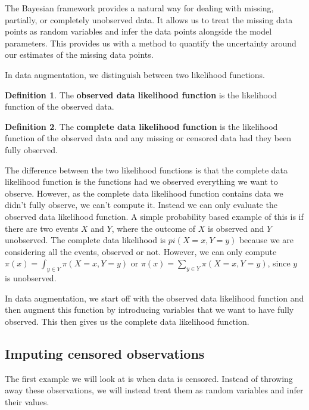 \documentclass[
]{book}
\theoremstyle{definition}
\newtheorem{definition}{Definition}[chapter]
\theoremstyle{definition}
\theoremstyle{definition}
\theoremstyle{definition}
\theoremstyle{remark}
\begin{document}
The Bayesian framework provides a natural way for dealing with missing, partially, or completely unobserved data. It allows us to treat the missing data points as random variables and infer the data points alongside the model parameters. This provides us with a method to quantify the uncertainty around our estimates of the missing data points.

In data augmentation, we distinguish between two likelihood functions.

\begin{definition}
The \textbf{observed data likelihood function} is the likelihood function of the observed data.
\end{definition}

\begin{definition}
The \textbf{complete data likelihood function} is the likelihood function of the observed data and any missing or censored data had they been fully observed.
\end{definition}

The difference between the two likelihood functions is that the complete data likelihood function is the functions had we observed everything we want to observe. However, as the complete data likelihood function contains data we didn't fully observe, we can't compute it. Instead we can only evaluate the observed data likelihood function. A simple probability based example of this is if there are two events \(X\) and \(Y\), where the outcome of \(X\) is observed and \(Y\) unobserved. The complete data likelihood is \(pi(X = x, Y = y)\) because we are considering all the events, observed or not. However, we can only compute \(\pi(x) = \int_{y \in Y}\pi(X = x, Y = y)\) or \(\pi(x) = \sum_{y \in Y}\pi(X = x, Y = y)\), since \(y\) is unobserved.

In data augmentation, we start off with the observed data likelihood function and then augment this function by introducing variables that we want to have fully observed. This then gives us the complete data likelihood function.

\hypertarget{imputing-censored-observations}{%
\subsection{Imputing censored observations}\label{imputing-censored-observations}}

The first example we will look at is when data is censored. Instead of throwing away these observations, we will instead treat them as random variables and infer their values.
\end{document}
